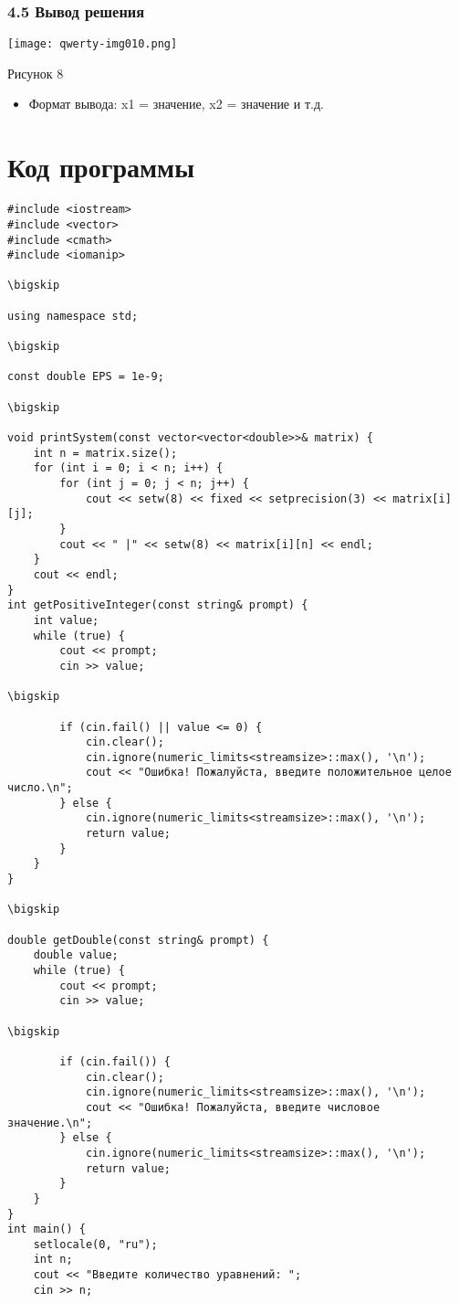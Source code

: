 \documentclass{article}
\begin{document}
\subsubsection{4.5 Вывод решения}
 \texttt{[image: qwerty-img010.png]} 

Рисунок 8

\begin{itemize}
\item Формат вывода: x1 = значение, x2 = значение и т.д.
\end{itemize}
\section{Код программы}
\begin{verbatim}
#include <iostream>
#include <vector>
#include <cmath>
#include <iomanip>

\bigskip

using namespace std;

\bigskip

const double EPS = 1e-9;

\bigskip

void printSystem(const vector<vector<double>>& matrix) {
    int n = matrix.size();
    for (int i = 0; i < n; i++) {
        for (int j = 0; j < n; j++) {
            cout << setw(8) << fixed << setprecision(3) << matrix[i][j];
        }
        cout << " |" << setw(8) << matrix[i][n] << endl;
    }
    cout << endl;
}
int getPositiveInteger(const string& prompt) {
    int value;
    while (true) {
        cout << prompt;
        cin >> value;

\bigskip

        if (cin.fail() || value <= 0) {
            cin.clear();
            cin.ignore(numeric_limits<streamsize>::max(), '\n');
            cout << "Ошибка! Пожалуйста, введите положительное целое число.\n";
        } else {
            cin.ignore(numeric_limits<streamsize>::max(), '\n');
            return value;
        }
    }
}

\bigskip

double getDouble(const string& prompt) {
    double value;
    while (true) {
        cout << prompt;
        cin >> value;

\bigskip

        if (cin.fail()) {
            cin.clear();
            cin.ignore(numeric_limits<streamsize>::max(), '\n');
            cout << "Ошибка! Пожалуйста, введите числовое значение.\n";
        } else {
            cin.ignore(numeric_limits<streamsize>::max(), '\n');
            return value;
        }
    }
}
int main() {
    setlocale(0, "ru");
    int n;
    cout << "Введите количество уравнений: ";
    cin >> n;


\end{verbatim}
\end{document}
